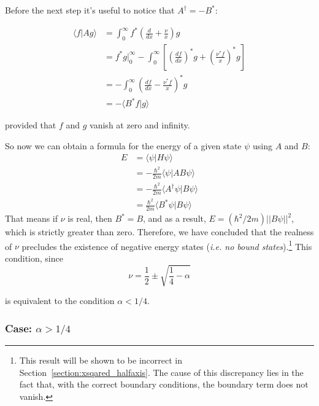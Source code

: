 \noindent
Before the next step it's useful to notice that $A^\dagger = - B^*$:

\begin{align*}
    \langle f | A g \rangle
     & = \int_{0}^{\infty} f^* \left( \frac{d}{dx} + \frac{\nu}{x} \right) g                                                            \\
     & = f^* g \Big|_0^\infty - \int_{0}^{\infty}  \left[\left( \frac{df}{dx} \right)^* g + \left( \frac{\nu^* f}{x} \right)^* g\right] \\
     & = - \int_{0}^{\infty} \left( \frac{df}{dx} - \frac{\nu^* f}{x} \right)^* g                                                       \\
     & = - \langle B^* f |  g \rangle
\end{align*}

provided that $f$ and $g$ vanish at zero and infinity.

\vspace{4mm}
\noindent
So now we can obtain a formula for the energy of a given state $\psi$ using $A$ and $B$:
\begin{align*}
    E & = \langle \psi | H \psi \rangle             \\
      & = - \frac{\hbar^2}{2m} \langle \psi | A B \psi \rangle         \\
      & = - \frac{\hbar^2}{2m} \langle A^\dagger \psi | B \psi \rangle \\
      & = \frac{\hbar^2}{2m} \langle B^* \psi | B \psi \rangle
\end{align*}
That means if $\nu$ is real, then $B^* = B$, and as a result, $E = (\hbar^2/2m) || B \psi ||^2$, which is strictly greater than zero. Therefore, we have concluded that the realness of $\nu$ precludes the existence of negative energy states (\textit{i.e. no bound states}).\footnote{This result will be shown to be incorrect in Section~\ref{section:xsqared_halfaxis}. The cause of this discrepancy lies in the fact that, with the correct boundary conditions, the boundary term does not vanish.}
This condition, since
\begin{equation*}
    \nu = \frac{1}{2} \pm \sqrt{\frac{1}{4} - \alpha}
\end{equation*}

is equivalent to the condition $\alpha < 1/4$.

\subsubsection{Case: \(\alpha > 1/4\)}

